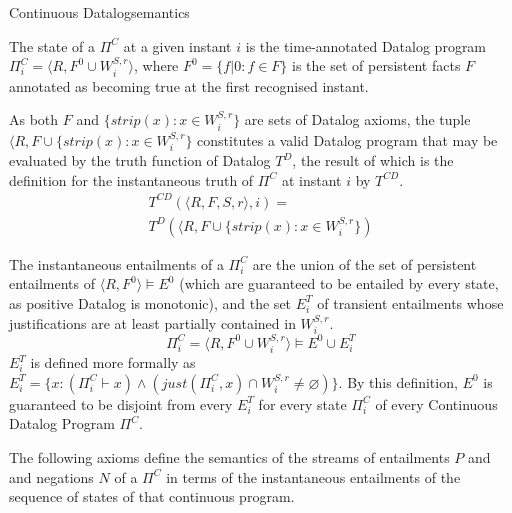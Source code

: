 \begin{nestedsection}{Continuous Datalog}{semantics}
\begin{definition}[State of a $\Pi^C$]\label{def:continuous datalog: CDPt}
The state of a $\Pi^C$ at a given instant $i$ is the time-annotated
Datalog program ${\Pi^C_i = \langle R, F^0 \cup W^{S,r}_{i} \rangle}$,
where ${F^0 = \{ f | 0 : f \in F \}}$ is the set of persistent facts $F$
annotated as becoming true at the first recognised instant.

As both $F$ and ${\{ strip(x) : x \in W^{S,r}_{i} \}}$ are sets of Datalog
axioms, the tuple ${\langle R, F \cup \{ strip(x) : x \in W^{S,r}_{i} \}}$
constitutes a valid Datalog program that may be evaluated by the truth
function of Datalog $T^{D}$, the result of which is the definition for the
instantaneous truth of $\Pi^C$ at instant $i$ by $T^{CD}$.
\begin{multline*}
T^{CD} \left( \langle R, F, S, r \rangle, i \right) = \\
	T^{D} \left( \langle R, F \cup \{ strip(x) : x \in W^{S,r}_{i} \} \right)
\end{multline*}

The instantaneous entailments of a $\Pi^C_i$ are the union of the set of
persistent entailments of ${\langle R, F^0 \rangle \vDash E^0}$ (which are
guaranteed to be entailed by every state, as positive Datalog is monotonic),
and the set $E^T_{i}$ of transient entailments whose justifications are at
least partially contained in $W^{S,r}_i$.
\begin{equation*}
\Pi^C_i = \langle R, F^0 \cup W^{S,r}_{i} \rangle \vDash E^0 \cup E^T_{i}
\end{equation*}
$E^T_i$ is defined more formally as
${E^T_{i} = \{ x : \left( \Pi^C_i \vdash x \right) \wedge
\left( just(\Pi^C_i,x) \cap W^{S,r}_i \neq \varnothing \right) \}}$.
By this definition, $E^0$ is guaranteed to be disjoint from every $E^T_i$
for every state $\Pi^C_i$ of every Continuous Datalog Program $\Pi^C$.
\end{definition}

The following axioms define the semantics of the streams of
entailments $P$ and and negations $N$ of a $\Pi^C$ in terms of the
instantaneous entailments of the sequence of states of that continuous
program.


\end{nestedsection}
